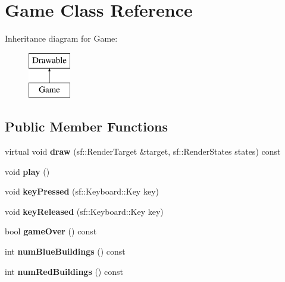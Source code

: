 \hypertarget{class_game}{}\section{Game Class Reference}
\label{class_game}
Inheritance diagram for Game\+:\begin{figure}[H]
\begin{center}
\leavevmode
\includegraphics[height=2.000000cm]{class_game}
\end{center}
\end{figure}
\subsection*{Public Member Functions}
\begin{DoxyCompactItemize}
\item 
\mbox{\label{class_game_a143d1a2f8a527db60f1fe47ab3d854a7}} 
virtual void {\bfseries draw} (sf\+::\+Render\+Target \&target, sf\+::\+Render\+States states) const
\item 
\mbox{\label{class_game_aa333825d0bca80e91e53c7e23f053405}} 
void {\bfseries play} ()
\item 
\mbox{\label{class_game_a8bd6da8e86da3a54d5f734ef162955c1}} 
void {\bfseries key\+Pressed} (sf\+::\+Keyboard\+::\+Key key)
\item 
\mbox{\label{class_game_afec9146cc342f8c21a1b23e14da0689a}} 
void {\bfseries key\+Released} (sf\+::\+Keyboard\+::\+Key key)
\item 
\mbox{\label{class_game_a549cde73db32c59d91f6e7f4fe673d2c}} 
bool {\bfseries game\+Over} () const
\item 
\mbox{\label{class_game_a879cc7faac9e7e5fb2d6caf7fe3ab57b}} 
int {\bfseries num\+Blue\+Buildings} () const
\item 
\mbox{\label{class_game_a0a33873d2ce5090cbe84840a78eeffc3}} 
int {\bfseries num\+Red\+Buildings} () const
\end{DoxyCompactItemize}
